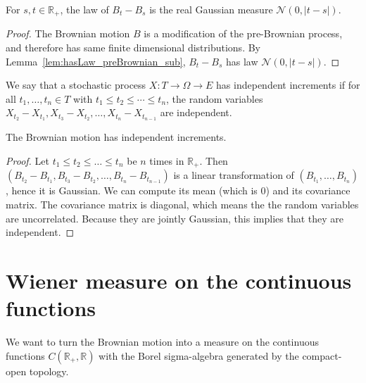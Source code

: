 \begin{lemma}\label{lem:hasLaw_brownian_sub}
  \leanok
For $s, t \in \mathbb{R}_+$, the law of $B_t - B_s$ is the real Gaussian measure $\mathcal{N}(0,\vert t - s \vert)$.
\end{lemma}

\begin{proof}\leanok
The Brownian motion $B$ is a modification of the pre-Brownian process, and therefore has same finite dimensional distributions. By Lemma~\ref{lem:hasLaw_preBrownian_sub}, $B_t - B_s$ has law $\mathcal{N}(0,\vert t - s \vert)$.
\end{proof}


\begin{definition}\label{def:HasIndepIncrements}
  \leanok
We say that a stochastic process $X : T \to \Omega \to E$ has independent increments if for all $t_1, \ldots, t_n \in T$ with $t_1 \le t_2 \le \cdots \le t_n$, the random variables $X_{t_2} - X_{t_1}, X_{t_3} - X_{t_2}, \ldots, X_{t_n} - X_{t_{n-1}}$ are independent.
\end{definition}


\begin{lemma}\label{lem:hasIndepIncrements_brownian}
  \leanok
The Brownian motion has independent increments.
\end{lemma}

\begin{proof}\leanok
Let $t_1 \le t_2 \le \ldots \le t_n$ be $n$ times in $\mathbb{R}_+$.
Then $(B_{t_2} - B_{t_1}, B_{t_3} - B_{t_2}, \ldots, B_{t_n} - B_{t_{n-1}})$ is a linear transformation of $(B_{t_1}, \ldots, B_{t_n})$, hence it is Gaussian.
We can compute its mean (which is $0$) and its covariance matrix.
The covariance matrix is diagonal, which means the the random variables are uncorrelated.
Because they are jointly Gaussian, this implies that they are independent.
\end{proof}


\section{Wiener measure on the continuous functions}

We want to turn the Brownian motion into a measure on the continuous functions $C(\mathbb{R}_+, \mathbb{R})$ with the Borel sigma-algebra generated by the compact-open topology.


